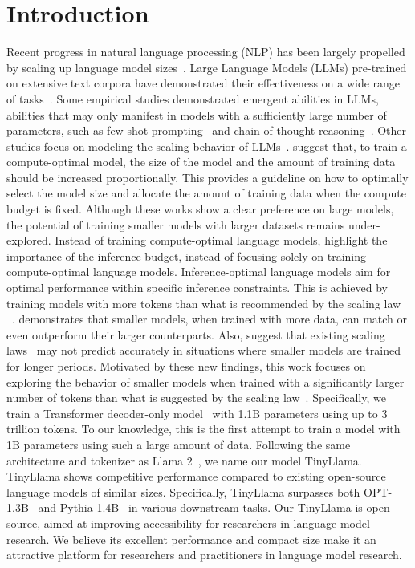 \documentclass{article}
\begin{document}
\section{Introduction}
Recent progress in natural language processing (NLP) has been largely propelled by scaling up language model sizes~\citep{brown2020gpt3,chowdhery2022palm,touvron2023llama,touvron2023llama2}.
Large Language Models (LLMs) pre-trained on extensive text corpora have demonstrated their effectiveness on a wide range of tasks~\citep{gpt4,touvron2023llama2}.
Some empirical studies demonstrated emergent abilities in LLMs, abilities that may only manifest in models with a sufficiently large number of parameters, such as few-shot prompting~\citep{brown2020gpt3} and chain-of-thought reasoning~\citep{wei2022cot}.
Other studies focus on modeling the scaling behavior of LLMs~\citep{kaplan2020scaling,hoffmann2022chinchilla}.
\cite{hoffmann2022chinchilla} suggest that, to train a compute-optimal model, the size of the model and the amount of training data should be increased proportionally.
This provides a guideline on how to optimally select the model size and allocate the amount of training data when the compute budget is fixed.
Although these works show a clear preference on large models,
    the potential of training smaller models with larger datasets remains under-explored.
Instead of training compute-optimal language models, \cite{touvron2023llama} highlight the importance of the inference budget, instead of focusing solely on training compute-optimal language models.
Inference-optimal language models aim for optimal performance within specific inference constraints.
This is achieved by training models with more tokens than what is recommended by the scaling law ~\citep{hoffmann2022chinchilla}.
\cite{touvron2023llama} demonstrates that smaller models, when trained with more data, can match or even outperform their larger counterparts.
Also, \cite{thaddee2020cd} suggest that existing scaling laws~\citep{hoffmann2022chinchilla} may not predict accurately in situations where smaller models are trained for longer periods.
Motivated by these new findings, this work focuses on exploring the behavior of smaller models when trained with a significantly larger number of tokens than what is suggested by the scaling law~\citep{hoffmann2022chinchilla}.
Specifically, we train a Transformer decoder-only model~\citep{vaswani2017transformer} with 1.1B parameters using up to 3 trillion tokens.
To our knowledge, this is the first attempt to train a model with 1B parameters using such a large amount of data.
Following the same architecture and tokenizer as Llama 2~\citep{touvron2023llama2}, we name our model TinyLlama.
TinyLlama shows competitive performance compared to existing open-source language models of similar sizes.
Specifically, TinyLlama surpasses both OPT-1.3B~\citep{zhang2022opt} and Pythia-1.4B~\citep{biderman2023pythia} in various downstream tasks.
Our TinyLlama is open-source, aimed at improving accessibility for researchers in language model research.
We believe its excellent performance and compact size make it an attractive platform for researchers and practitioners in language model research.
\vspace{-1em}
\end{document}
